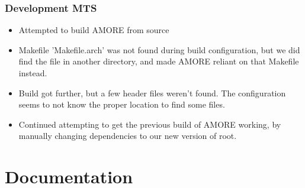 \documentclass[aspectratio=169]{beamer}
\begin{document}
\begin{frame}

  \frametitle{Development MTS}

  \begin{itemize}
    \item Attempted to build AMORE from source
    \item Makefile 'Makefile.arch' was not found during build configuration, but
      we did find the file in another directory, and made AMORE reliant on that
      Makefile instead.
    \item Build got further, but a few header files weren't found. The
      configuration seems to not know the proper location to find some files.
    \item Continued attempting to get the previous build of AMORE working, by
    	  manually changing dependencies to our new version of root.
  \end{itemize}

\end{frame}



\section{Documentation}
\end{document}
